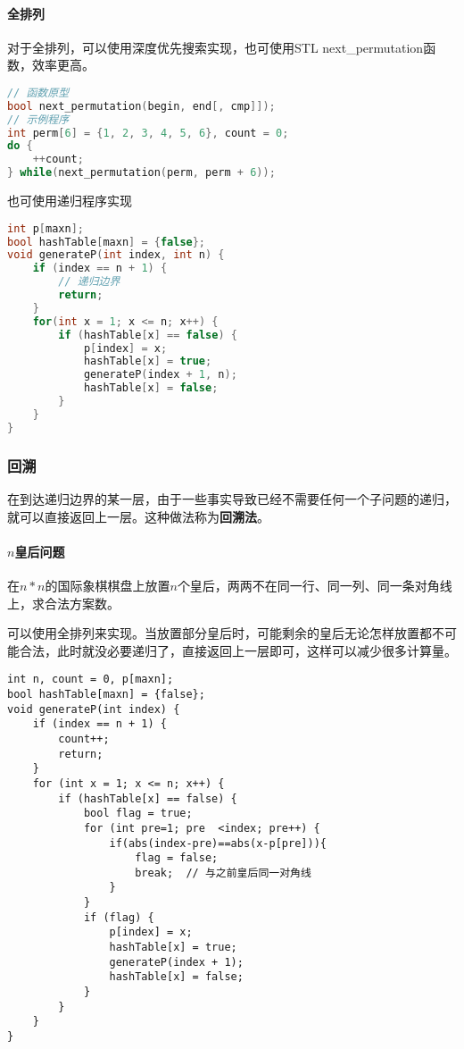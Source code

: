 \paragraph{全排列}

对于全排列，可以使用深度优先搜索实现，也可使用STL next\_permutation函数，效率更高。

\begin{lstlisting}[language=c++]
// 函数原型
bool next_permutation(begin, end[, cmp]]);
// 示例程序
int perm[6] = {1, 2, 3, 4, 5, 6}, count = 0;
do {
	++count;
} while(next_permutation(perm, perm + 6));
\end{lstlisting}

也可使用递归程序实现

\begin{lstlisting}[language=c++]
int p[maxn];
bool hashTable[maxn] = {false};
void generateP(int index, int n) {
	if (index == n + 1) {
		// 递归边界
		return;
	}
	for(int x = 1; x <= n; x++) {
		if (hashTable[x] == false) {
			p[index] = x;
			hashTable[x] = true;
			generateP(index + 1, n);
			hashTable[x] = false;
		}
	}
}
\end{lstlisting}

\subsubsection{回溯}

在到达递归边界的某一层，由于一些事实导致已经不需要任何一个子问题的递归，就可以直接返回上一层。这种做法称为\textbf{回溯法}。

\paragraph{$n$皇后问题}

在$n*n$的国际象棋棋盘上放置$n$个皇后，两两不在同一行、同一列、同一条对角线上，求合法方案数。

可以使用全排列来实现。当放置部分皇后时，可能剩余的皇后无论怎样放置都不可能合法，此时就没必要递归了，直接返回上一层即可，这样可以减少很多计算量。

\begin{lstlisting}
int n, count = 0, p[maxn];
bool hashTable[maxn] = {false};
void generateP(int index) {
	if (index == n + 1) {
		count++;
		return;
	}
	for (int x = 1; x <= n; x++) {
		if (hashTable[x] == false) {
			bool flag = true;
			for (int pre=1; pre  <index; pre++) {
				if(abs(index-pre)==abs(x-p[pre])){
					flag = false;
					break;	// 与之前皇后同一对角线
				}
			}
			if (flag) {
				p[index] = x;
				hashTable[x] = true;
				generateP(index + 1);
				hashTable[x] = false;
			}
		}
	}
}
\end{lstlisting}

